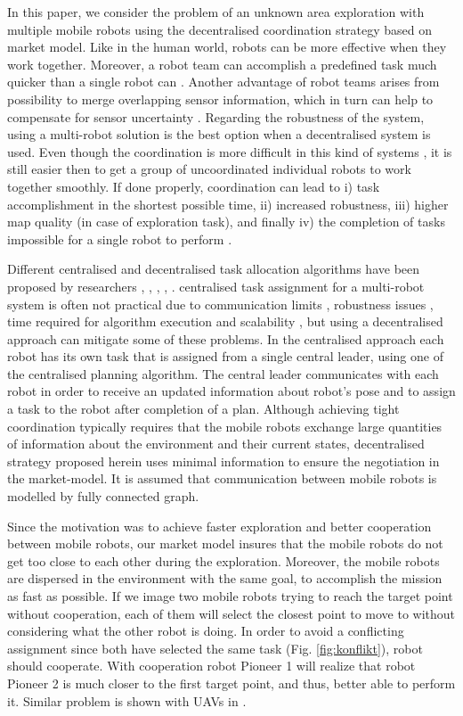 \documentclass[letterpaper, 10 pt, conference]{ieeeconf}  %
\begin{document}
In this paper, we consider the problem of an unknown area exploration with multiple mobile robots using the decentralised coordination strategy based on market model. Like in the human world, robots can be more effective when they work together. Moreover, a robot team can accomplish a predefined task much quicker than a single robot can \cite{free-market}. Another advantage of robot teams arises from possibility to merge overlapping sensor information, which in turn can help to compensate for sensor uncertainty \cite{segmentation}. Regarding the robustness of the system, using a multi-robot solution is the best option when a decentralised system is used. Even though the coordination is more difficult in this kind of systems \cite{Julia}, it is still easier then to get a group of uncoordinated individual robots to work together smoothly.
If done properly, coordination can lead to i) task accomplishment in the shortest possible time, ii) increased robustness, iii) higher map quality (in case of exploration task), and finally iv) the completion of tasks impossible for a single robot to perform \cite{survey-analysis}.

Different centralised and decentralised task allocation algorithms have been proposed by researchers \cite{Yamauchi}, \cite{burgard}, \cite{Simmons}, \cite{Sheng}, \cite{Konolige}. centralised task assignment for a multi-robot system is often not practical due to communication limits  \cite{free-market}, robustness issues \cite{survey-analysis}, time required for algorithm execution and scalability \cite{Julia}, but using a decentralised approach can mitigate some of these problems. In the centralised approach each robot has its own task that is assigned from a single central leader, using one of the centralised planning algorithm. The central leader communicates with each robot in order to receive an updated information about robot's pose and to assign a task to the robot after completion of a plan. Although achieving tight coordination typically requires that the mobile robots exchange large quantities of information about the environment and their current states, decentralised strategy proposed herein uses minimal information to ensure the negotiation in the market-model. It is assumed that communication between mobile robots is modelled by fully connected graph.  

Since the motivation was to achieve faster exploration and better cooperation between mobile robots, our market model insures that the mobile robots do not get too close to each other during the exploration. Moreover, the mobile robots are dispersed in the environment with the same goal, to accomplish the mission as fast as possible. If we image two mobile robots trying to reach the target point without cooperation, each of them will select the closest point to move to without considering what the other robot is doing. In order to avoid a conflicting assignment since both have selected the same task (Fig. \ref{fig:konflikt}), robot should cooperate. With cooperation robot Pioneer 1 will realize that robot Pioneer 2 is much closer to the first target point, and thus, better able to perform it. Similar problem is shown with UAVs in \cite{mit}. 
\end{document}
